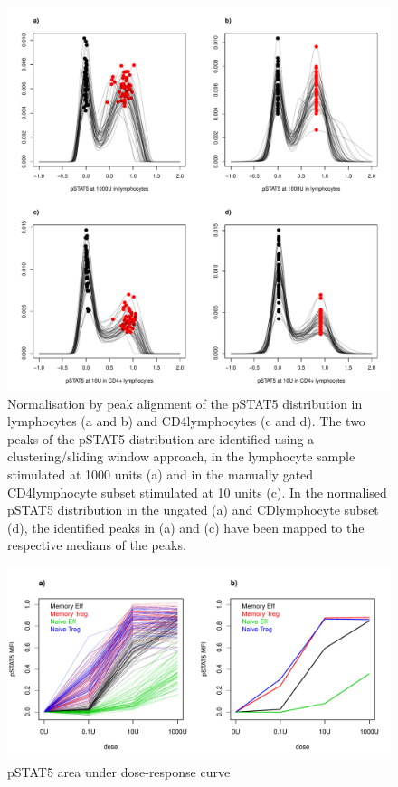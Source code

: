 \begin{figure}[h]
    \centering
    \includegraphics[scale=.5]{IL2/figures/pstat5-peak-normalisation.pdf}
    {Normalisation by peak alignment of the pSTAT5 distribution in lymphocytes (a and b) and CD4\positive lymphocytes (c and d).}
    {
      The two peaks of the pSTAT5 distribution are identified using a clustering/sliding window approach,
      in the lymphocyte sample stimulated at 1000 units (a) and in the manually gated CD4\positive lymphocyte subset stimulated at 10 units (c).
      In the normalised pSTAT5 distribution in the ungated (a) and CD\positive lymphocyte subset (d),
      the identified peaks in (a) and (c) have been mapped to the respective medians of the peaks.
    }
\end{figure}


\begin{figure}[h]
    \centering
    \includegraphics[scale=.5]{IL2/figures/pstat5-auc-celltypes.pdf}
    { pSTAT5 area under dose-response curve }
    { }
\end{figure}

